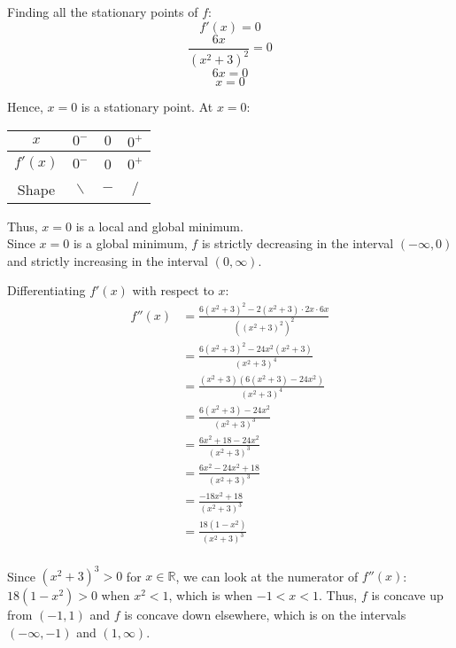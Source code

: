\documentclass[11pt]{article}
\begin{document}
Finding all the stationary points of \(f\):
\[f'(x) = 0\]
\[\frac{6x}{(x^2 + 3)^2} = 0\]
\[6x = 0\]
\[x = 0\]

Hence, \(x = 0\) is a stationary point. At \(x = 0\):

\begin{center}
\begin{tabular}{|c|c|c|c|}
\hline
$x$ & \(0^-\) & \(0\) & \(0^+\) \\
\hline
$f'(x)$ & $0^-$ & 0 & $0^+$ \\
\hline
Shape & $\backslash$ & $-$ & $\slash$ \\
\hline
\end{tabular}
\end{center}

Thus, \(x = 0\) is a local and global minimum.
\\[0pt]

Since \(x = 0\) is a global minimum, \(f\) is strictly decreasing in the interval \((- \infty, 0)\) and strictly increasing in the interval \((0, \infty)\).

Differentiating \(f'(x)\) with respect to \(x\):
\begin{align*}
f''(x) &= \frac{6(x^2 + 3)^2 - 2(x^2 + 3) \cdot 2x \cdot 6x}{((x^2 + 3)^2)^2} \\
&= \frac{6(x^2 + 3)^2 - 24x^2(x^2 + 3)}{(x^2 + 3)^4} \\
&= \frac{(x^2 + 3) (6(x^2 + 3) - 24x^2)}{(x^2 + 3)^4} \\
&= \frac{6(x^2 + 3) - 24x^2}{(x^2 + 3)^3} \\
&= \frac{6x^2 + 18 - 24x^2}{(x^2 + 3)^3} \\
&= \frac{6x^2 - 24x^2 + 18}{(x^2 + 3)^3} \\
&= \frac{-18x^2 + 18}{(x^2 + 3)^3} \\
&= \frac{18(1 - x^2)}{(x^2 + 3)^3} \\
\end{align*}

Since \((x^2 + 3)^3 > 0\) for \(x \in \mathbb{R}\), we can look at the numerator of \(f''(x)\):
\\[0pt]

\(18(1 - x^2) > 0\) when \(x^2 < 1\), which is when \(-1 < x < 1\). Thus, \(f\) is concave up from \((-1, 1)\) and \(f\) is concave down elsewhere, which is on the intervals \((-\infty, -1)\) and \((1, \infty)\).

\begin{center}
\end{center}
\end{document}

